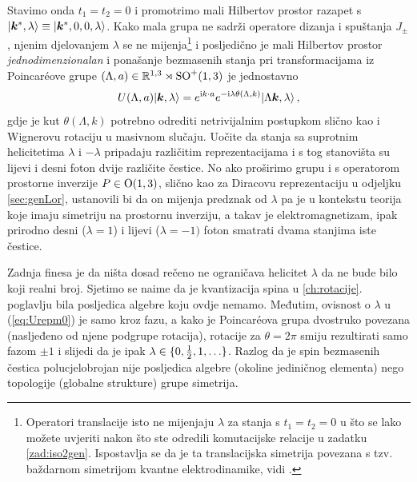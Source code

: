Stavimo onda $t_1=t_2=0$ i promotrimo mali Hilbertov prostor
razapet s $\ket{\vec{k}^{*}, \lambda} \equiv \ket{\vec{k}^{*}, 0, 0, \lambda}$.
Kako mala grupa ne sadrži
operatore dizanja i spuštanja $J_{\pm}$, njenim djelovanjem $\lambda$
se ne mijenja\footnote{Operatori translacije isto ne mijenjaju $\lambda$
    za stanja s $t_1=t_2=0$ u što se lako možete uvjeriti nakon što
ste odredili komutacijske relacije u zadatku \ref{zad:iso2gen}.
Ispostavlja se da je ta translacijska simetrija povezana s tzv.
baždarnom simetrijom kvantne elektrodinamike, vidi \cite{Weinberg:1995mt}.}
i posljedično je mali Hilbertov prostor \emph{jednodimenzionalan} i
ponašanje bezmasenih stanja pri
transformacijama iz Poincar\'{e}ove grupe 
$(\Lambda, a) \in \mathbb{R}^{1,3}\rtimes\mathrm{SO}^{+}(1,3)$ je jednostavno
\begin{equation}
    U(\Lambda, a) \ket{\vec{k}, \lambda} = e^{\rmi k\cdot a}
    e^{-\rmi \lambda \theta(\Lambda, k)} \ket{\Lambda\vec{k}, \lambda} \,,
    \label{eq:Urepm0}
\end{equation}
gdje je kut $\theta(\Lambda, k)$ potrebno odrediti netrivijalnim postupkom slično kao
i Wignerovu rotaciju u masivnom slučaju.
Uočite da stanja sa suprotnim helicitetima $\lambda$ i $-\lambda$ pripadaju
različitim reprezentacijama
i s tog stanovišta su lijevi i desni foton dvije različite čestice.
No ako proširimo grupu i s operatorom prostorne inverzije $P\in \mathrm{O}(1,3)$, slično kao za Diracovu
reprezentaciju u odjeljku \ref{sec:genLor}, ustanovili bi da
on mijenja predznak od $\lambda$ pa je u kontekstu teorija koje
imaju simetriju na prostornu inverziju, a takav je elektromagnetizam,
ipak prirodno desni ($\lambda=1$) i lijevi ($\lambda=-1)$ 
foton smatrati dvama stanjima iste čestice.

Zadnja finesa je da ništa dosad rečeno ne ograničava helicitet $\lambda$
da ne bude bilo koji realni broj. Sjetimo se naime da je kvantizacija
spina u \ref{ch:rotacije}. poglavlju bila posljedica  algebre
koju ovdje nemamo. Međutim, ovisnost o $\lambda$
u (\ref{eq:Urepm0}) je samo kroz fazu, a kako je Poincar\'{e}ova grupa
dvostruko povezana (nasljeđeno od njene  podgrupe rotacija),
rotacije za $\theta=2\pi$ smiju rezultirati samo fazom $\pm 1$ i
slijedi da je ipak $\lambda \in \{0, \frac{1}{2}, 1, \ldots\}$. Razlog
da je spin bezmasenih čestica polucjelobrojan nije posljedica
algebre (okoline jediničnog elementa) nego topologije (globalne strukture)
grupe simetrija.





